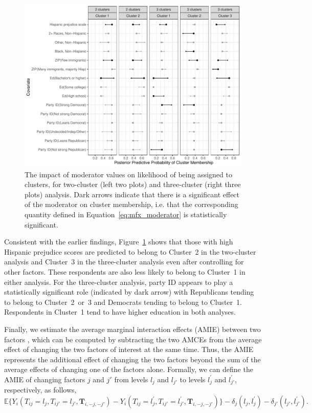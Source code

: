 \documentclass[11pt]{article}
\newcommand\E{\mathbb{E}}
\newcommand\bT{\bm{T}}
\newcommand\spacingset[1]{\renewcommand{\baselinestretch}%
  {#1}\small\normalsize}
\begin{document}
\begin{figure}[!t]
\centering \spacingset{1}
\includegraphics[width=\textwidth]{figures/mod_plot.pdf}
\caption{The impact of moderator values on likelihood of being
  assigned to clusters, for two-cluster (left two plots) and
  three-cluster (right three plots) analysis. 
 Dark arrows indicate that there is a significant effect of the moderator on cluster membership, i.e. that the corresponding quantity defined in Equation~\eqref{eq:mfx_moderator} is statistically significant.} \label{fig:mod}
\end{figure}

Consistent with the earlier findings, Figure~\ref{fig:mod} shows that
those with high Hispanic prejudice scores are predicted to belong to
Cluster~2 in the two-cluster analysis and Cluster~3 in the
three-cluster analysis even after controlling for other factors.
These respondents are also less likely to belong to Cluster~1 in
either analysis.  For the three-cluster analysis, party ID appears to
play a statistically significant role (indicated by dark arrow) with
Republicans tending to belong to Cluster~2~or~3 and Democrats tending
to belong to Cluster~1.  Respondents in Cluster~1 tend to have higher
education in both analyses.

Finally, we estimate the average marginal interaction effects (AMIE)
between two factors \citep{egam:imai:19}, which can be computed by
subtracting the two AMCEs from the average effect of changing the two
factors of interest at the same time.  Thus, the AMIE represents the
additional effect of changing the two factors beyond the sum of the
average effects of changing one of the factors alone.  Formally, we
can define the AMIE of changing factors $j$ and $j'$ from levels $l_j$
and $l_{j'}$ to levels $l_j^\prime$ and $l_{j'}^\prime$, respectively,
as follows, 
\begin{equation*}
  \E\{Y_i(T_{ij} = l_j, T_{ij'} = l_{j'}, \bT_{i,-j,-j'}) - Y_i(T_{ij}
  = l_j^\prime, T_{ij'} = l_{j'}^\prime, \bT_{i,-j,-j'})\} -
  \delta_j(l_j, l_j^\prime) - \delta_{j'}(l_{j'}, l_{j'}^\prime).
\end{equation*}
\end{document}
